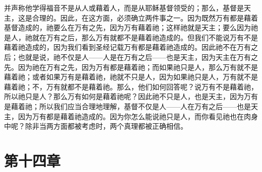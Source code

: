 并声称他学得福音不是从人或藉着人，而是从耶稣基督领受的；那么，基督是天主，这是合理的。因此，在这方面，必须确立两件事之一。因为既然万有都是藉着基督造成的，祂要么在万有之先，因为万有藉着祂；这样祂就是天主；要么因为祂是人，祂就在万有之后，那么万有就都不是藉着祂造成的。但我们不能说万有不是藉着祂造成的，因为我们看到圣经记载万有都是藉着祂造成的。因此祂不在万有之后；也就是说，祂不仅是人——人是在万有之后——也是天主，因为天主在万有之先。因为祂在万有之先，因为万有都是藉着祂；而如果祂只是人，那么万有就不是藉着祂；或者如果万有是藉着祂，祂就不只是人，因为如果祂只是人，万有就不是藉着祂；不，万有就都不是藉着祂。那么，他们如何回答呢？说万有不是藉着祂，所以祂只是人？那么万有如何是藉着祂呢？因此祂不只是人，也是天主，因为万有是藉着祂；所以我们应当合理地理解，基督不仅是人——人在万有之后——也是天主，因为万有都是藉着祂造成的。因为你怎么能说祂只是人，而你看见祂也在肉身中呢？除非当两方面都被考虑时，两个真理都被正确相信。\par


\section{第十四章}

\par

